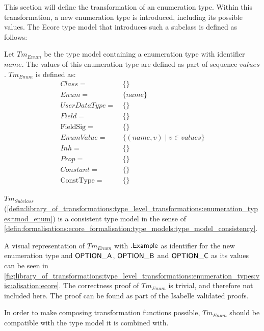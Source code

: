 This section will define the transformation of an enumeration type. Within this transformation, a new enumeration type is introduced, including its possible values. The Ecore type model that introduces such a subclass is defined as follows:

\begin{defin}
\label{defin:library_of_transformations:type_level_transformations:enumeration_types:tmod_enum}
Let $Tm_{Enum}$ be the type model containing a enumeration type with identifier $name$. The values of this enumeration type are defined as part of sequence $values$. $Tm_{Enum}$ is defined as:
\begin{align*}
Class =\ &\{\} \\
Enum =\ &\{name\} \\
UserDataType =\ &\{\} \\
Field =\ &\{\} \\
\mathrm{FieldSig} =\ &\{\} \\
EnumValue =\ &\{ (name, v) \mid v \in values \} \\
Inh =\ &\{\} \\
Prop =\ &\{\} \\
Constant =\ &\{\} \\
\mathrm{ConstType} =\ &\{\}
\end{align*}
\end{defin}

\begin{thm}
\label{defin:library_of_transformations:type_level_transformations:enumeration_types:tmod_enum_correct}
$Tm_{Subclass}$ (\cref{defin:library_of_transformations:type_level_transformations:enumeration_types:tmod_enum}) is a consistent type model in the sense of \cref{defin:formalisations:ecore_formalisation:type_models:type_model_consistency}.
\end{thm}

A visual representation of $Tm_{Enum}$ with $.\mathsf{Example}$ as identifier for the new enumeration type and $\mathsf{OPTION\_A}$, $\mathsf{OPTION\_B}$ and $\mathsf{OPTION\_C}$ as its values can be seen in \cref{fig:library_of_transformations:type_level_transformations:enumeration_types:visualisation:ecore}. The correctness proof of $Tm_{Enum}$ is trivial, and therefore not included here. The proof can be found as part of the Isabelle validated proofs.

In order to make composing transformation functions possible, $Tm_{Enum}$ should be compatible with the type model it is combined with.

